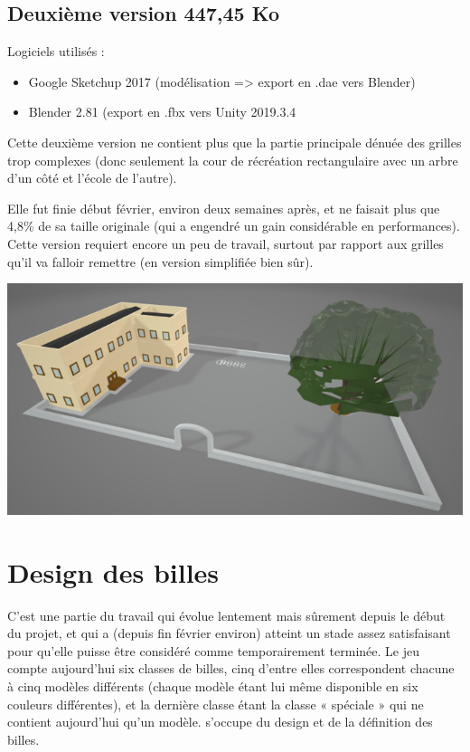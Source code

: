 \documentclass{article}
\begin{document}
\subsection{Deuxième version 447,45 Ko}
Logiciels utilisés :
\begin{itemize}
    \item Google Sketchup 2017 (modélisation => export en .dae vers Blender)
    \item Blender 2.81 (export en .fbx vers Unity 2019.3.4
\end{itemize}

Cette deuxième version ne contient plus que la partie principale dénuée des grilles trop complexes (donc seulement la cour de récréation rectangulaire avec un arbre d’un côté et l’école de l’autre).

Elle fut finie début février, environ deux semaines après, et ne faisait plus que 4,8\% de sa taille 	originale (qui a engendré un gain considérable en performances).
Cette version requiert encore un peu de travail, surtout par rapport aux grilles qu’il va falloir 	remettre (en version simplifiée bien sûr).

\begin{center}
\includegraphics[width=0.8\linewidth]{report/map2.png}\\
\end{center}

\section{Design des billes}
C’est une partie du travail qui évolue lentement mais sûrement depuis le début du projet, et qui a (depuis fin février environ) atteint un stade assez satisfaisant pour qu’elle puisse être considéré comme temporairement terminée. Le jeu compte aujourd’hui six classes de billes, cinq d’entre elles correspondent chacune à cinq modèles différents (chaque modèle étant lui même disponible en six couleurs différentes), et la dernière classe étant la classe « spéciale » qui ne contient aujourd’hui qu’un modèle.  s'occupe du design et de la définition des billes.
\end{document}
